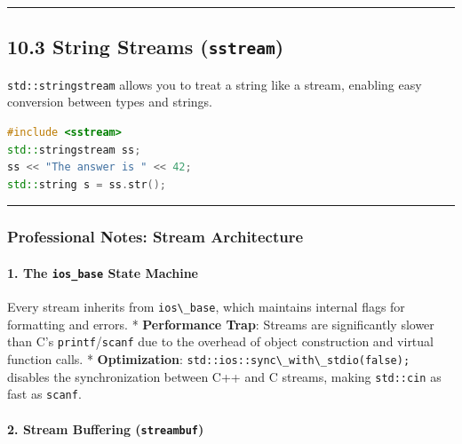 \begin{center}\rule{0.5\linewidth}{0.5pt}\end{center}

\hypertarget{string-streams-sstream}{%
\subsection{\texorpdfstring{10.3 String Streams
(\texttt{sstream})}{10.3 String Streams (sstream)}}\label{string-streams-sstream}}

\passthrough{\lstinline!std::stringstream!} allows you to treat a string
like a stream, enabling easy conversion between types and strings.

\begin{lstlisting}[language={C++}]
#include <sstream>
std::stringstream ss;
ss << "The answer is " << 42;
std::string s = ss.str();
\end{lstlisting}

\begin{center}\rule{0.5\linewidth}{0.5pt}\end{center}

\hypertarget{professional-notes-stream-architecture}{%
\subsubsection{Professional Notes: Stream
Architecture}\label{professional-notes-stream-architecture}}

\hypertarget{the-ios_base-state-machine}{%
\paragraph{\texorpdfstring{1. The \texttt{ios\_base} State
Machine}{1. The ios\_base State Machine}}\label{the-ios_base-state-machine}}

Every stream inherits from \passthrough{\lstinline!ios\_base!}, which
maintains internal flags for formatting and errors. *
\textbf{Performance Trap}: Streams are significantly slower than C's
\passthrough{\lstinline!printf!}/\passthrough{\lstinline!scanf!} due to
the overhead of object construction and virtual function calls. *
\textbf{Optimization}:
\passthrough{\lstinline!std::ios::sync\_with\_stdio(false);!} disables
the synchronization between C++ and C streams, making
\passthrough{\lstinline!std::cin!} as fast as
\passthrough{\lstinline!scanf!}.

\hypertarget{stream-buffering-streambuf}{%
\paragraph{\texorpdfstring{2. Stream Buffering
(\texttt{streambuf})}{2. Stream Buffering (streambuf)}}\label{stream-buffering-streambuf}}

